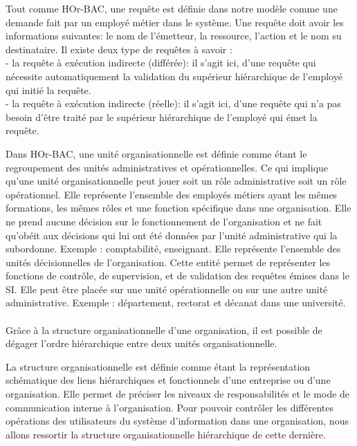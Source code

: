 \label{sectionRequête}

Tout comme HOr-BAC, une requête est définie dans notre modèle comme une demande fait par un employé métier dans  le système. Une requête doit avoir les informations suivantes: le nom de l'émetteur, la ressource, l'action et le nom su destinataire. Il existe deux type de requêtes à savoir :\\
- la requête à exécution indirecte (différée): il s'agit ici, d'une requête qui nécessite automatiquement la validation du supérieur hiérarchique de l'employé qui initié la requête.\\
- la requête à exécution indirecte (réelle): il s'agit ici, d'une requête qui n'a pas besoin d'être traité par le supérieur hiérarchique de l'employé qui émet la requête. 

\label{sectionUnitéOrg}

Dans HOr-BAC, une unité organisationnelle est définie comme étant le regroupement des unités administratives et opérationnelles. Ce qui implique qu'une unité organisationnelle peut jouer soit un rôle administrative soit un rôle opérationnel.
\label{sectionUnitéOpérationnelle}
Elle représente l'ensemble des employés métiers ayant les mêmes formations, les mêmes rôles et une fonction spécifique dans une organisation. Elle ne prend aucune décision sur le fonctionnement de l'organisation et ne fait qu'obéit aux décisions qui lui ont été données par l'unité administrative qui la subordonne. Exemple : comptabilité, enseignant. 
\label{sectionUnitéAdministrative}
Elle représente l'ensemble des unités décisionnelles de l'organisation. Cette entité permet de représenter les fonctions de contrôle, de supervision, et de validation des requêtes émises dans le SI. Elle peut être placée sur une unité opérationnelle ou sur une autre unité administrative. Exemple : département, rectorat et décanat dans une université.
\paragraph{}Grâce à la structure organisationnelle d'une organisation, il est possible de dégager l'ordre hiérarchique entre deux unités organisationnelle.

\label{sectionStructureOrg}

La structure organisationnelle est définie comme étant la représentation schématique des liens hiérarchiques et fonctionnels d'une entreprise ou d'une organisation. Elle permet de préciser les niveaux de responsabilités et le mode de communication interne à l'organisation. Pour pouvoir contrôler les différentes opérations des utilisateurs du système d'information dans une organisation, nous allons ressortir la structure organisationnelle hiérarchique de cette dernière.
